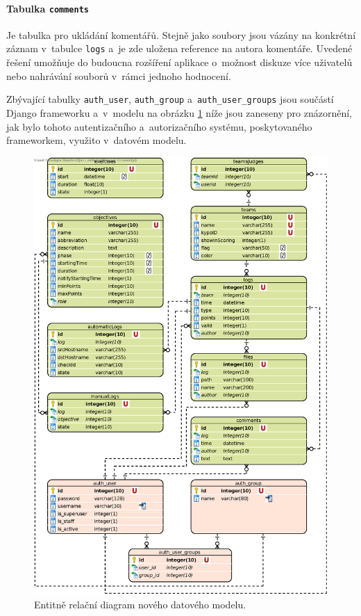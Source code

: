 \documentclass[
  digital,
  twoside,
  table, 
  nolof, 
  nolot
]{fithesis3}
\begin{document}
\paragraph{Tabulka \texttt{comments}} Je tabulka pro ukládání komentářů. Stejně jako soubory jsou vázány na konkrétní záznam v~tabulce \texttt{logs} a~je zde uložena reference na autora komentáře. Uvedené řešení umožňuje do budoucna rozšíření aplikace o~možnost diskuze více uživatelů nebo nahrávání souborů v~rámci jednoho hodnocení.

Zbývající tabulky \texttt{auth\_user}, \texttt{auth\_group} a~\texttt{auth\_user\_groups} jsou součástí Django frameworku a~v~modelu na obrázku \ref{fig:erdNewApp} níže jsou zaneseny pro znázornění, jak bylo tohoto autentizačního a~autorizačního systému, poskytovaného frameworkem, využito v~datovém modelu.

\begin{figure}
    \centering
    \includegraphics[width=12.5cm]{images/ERD-new-app.eps}
    \caption{Entitně relační diagram nového datového modelu.}
    \label{fig:erdNewApp}
\end{figure}
\end{document}
